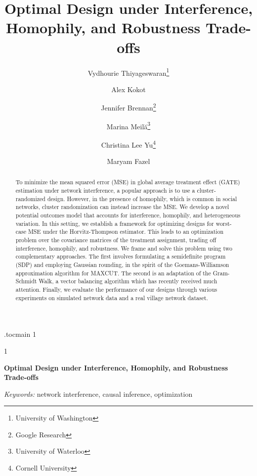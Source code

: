 \documentclass[12pt]{article}
\theoremstyle{definition}
\numberwithin{equation}{section}
\numberwithin{figure}{section}
\newcommand{\anon}{1}
\numberwithin{equation}{section}
\numberwithin{figure}{section}
\begin{document}
\etocdepthtag.toc{main}
\def\spacingset#1{\renewcommand{\baselinestretch}%
{#1}\small\normalsize} \spacingset{1}
\anon
{
\title{\bf Optimal Design under Interference, Homophily, and Robustness Trade-offs}

\author{
Vydhourie Thiyageswaran\thanks{University of Washington} \and
Alex Kokot\footnotemark[1] \and
Jennifer Brennan\thanks{Google Research} \and
Marina Meil\u{a}\thanks{University of Waterloo} \and
Christina Lee Yu\thanks{Cornell University} \and
Maryam Fazel\footnotemark[1]
}
\date{} 
\maketitle
} \fi

\anon
{
  \bigskip
  \bigskip
  \bigskip
  \begin{center}
    {\LARGE\bf Optimal Design under Interference, Homophily, and Robustness Trade-offs}
\end{center}
  \medskip
} \fi


\begin{abstract}
    To minimize the mean squared error (MSE) in global average treatment effect (GATE) estimation under network interference, a popular approach is to use a cluster-randomized design. However, in the presence of homophily, which is common in social networks, cluster randomization can instead increase the MSE. We develop a novel potential outcomes model that accounts for interference, homophily, and heterogeneous variation. In this setting, we establish a framework for optimizing designs for worst-case MSE under the Horvitz-Thompson estimator. This leads to an optimization problem over the covariance matrices of the treatment assignment, trading off interference, homophily, and robustness. We frame and solve this problem using two complementary approaches. The first involves formulating a semidefinite program (SDP) and employing Gaussian rounding, in the spirit of the Goemans-Williamson approximation algorithm for MAXCUT. The second is an adaptation of the Gram-Schmidt Walk, a vector balancing algorithm which has recently received much attention. Finally, we evaluate the performance of our designs through various experiments on simulated network data and a real village network dataset.
\end{abstract}

\noindent%
{\it Keywords:} network interference, causal inference, optimization
\vfill

\newpage
\spacingset{1.8} %
\end{document}
